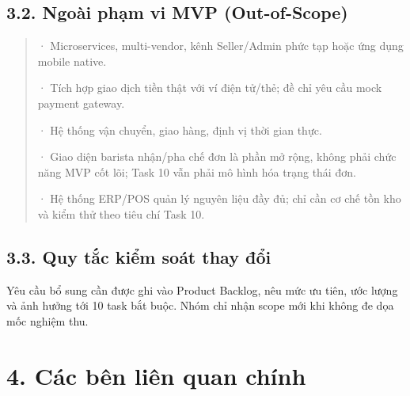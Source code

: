 \documentclass[11pt,a4paper,oneside]{report}
\begin{document}
\subsection{\texorpdfstring{\textbf{3.2. Ngoài phạm vi MVP (Out-of-Scope)}}{3.2. Ngoài phạm vi MVP (Out-of-Scope)}}\label{01-project-charter:ngouxe0i-phux1ea1m-vi-mvp-out-of-scope}

\begin{quote}
· Microservices, multi-vendor, kênh Seller/Admin phức tạp hoặc ứng dụng mobile native.

· Tích hợp giao dịch tiền thật với ví điện tử/thẻ; đề chỉ yêu cầu mock payment gateway.

· Hệ thống vận chuyển, giao hàng, định vị thời gian thực.

· Giao diện barista nhận/pha chế đơn là phần mở rộng, không phải chức năng MVP cốt lõi; Task 10 vẫn phải mô hình hóa trạng thái đơn.

· Hệ thống ERP/POS quản lý nguyên liệu đầy đủ; chỉ cần cơ chế tồn kho và kiểm thử theo tiêu chí Task 10.
\end{quote}

\subsection{\texorpdfstring{\textbf{3.3. Quy tắc kiểm soát thay đổi}}{3.3. Quy tắc kiểm soát thay đổi}}\label{01-project-charter:quy-tux1eafc-kiux1ec3m-souxe1t-thay-ux111ux1ed5i}

Yêu cầu bổ sung cần được ghi vào Product Backlog, nêu mức ưu tiên, ước lượng và ảnh hưởng tới 10 task bắt buộc. Nhóm chỉ nhận scope mới khi không đe dọa mốc nghiệm thu.

\section{\texorpdfstring{\textbf{4. Các bên liên quan chính}}{4. Các bên liên quan chính}}\label{01-project-charter:cuxe1c-buxean-liuxean-quan-chuxednh}
\end{document}
